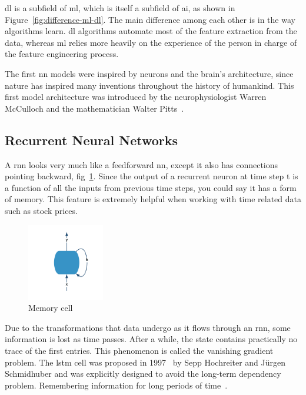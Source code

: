 \gls{dl} is a subfield of \gls{ml}, which is itself a subfield of \gls{ai}, as shown in Figure~\ref{fig:difference-ml-dl}. The main difference among each other is in the way algorithms learn. \gls{dl} algorithms automate most of the feature extraction from the data, whereas \gls{ml} relies more heavily on the experience of the person in charge of the feature engineering process.

The first \gls{nn} models were inspired by neurons and the brain's architecture, since nature has inspired many inventions throughout the history of humankind. This first model architecture was introduced by the neurophysiologist Warren McCulloch and the mathematician Walter Pitts~\cite{nnModelDefinition}.\newline

\subsection{Recurrent Neural Networks}

A \gls{rnn} looks very much like a feedforward \gls{nn}, except it also has connections pointing backward, fig~\ref{fig:memory-cell}. Since the output of a recurrent neuron at time step t is a function of all the inputs from previous time steps, you could say it has a form of memory\cite{handsOnMachine}. This feature is extremely helpful when working with time related data such as stock prices.

\begin{figure}[H]
    \centering
    \caption{\label{fig:memory-cell} Memory cell}
    \includegraphics[width=0.30\textwidth]{figures/memory-cell.png}
\end{figure}

Due to the transformations that data undergo as it flows through an \gls{rnn}, some information is lost as time passes. After a while, the state contains practically no trace of the first entries. This phenomenon is called the vanishing gradient problem. The \gls{lstm} cell was proposed in 1997~\cite{lstm1997} by Sepp Hochreiter and Jürgen Schmidhuber and was explicitly designed to avoid the long-term dependency problem. Remembering information for long periods of time~\cite{understandLSTM}.

